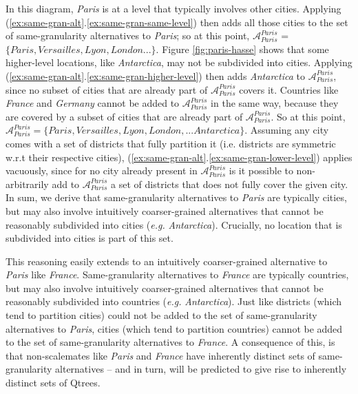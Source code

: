 	In this diagram, \textit{Paris} is at a level that typically involves other cities. Applying (\ref{ex:same-gran-alt}.\ref{ex:same-gran-same-level}) then adds all those cities to the set of same-granularity alternatives to \textit{Paris}; so at this point, $\mathcal{A}_{\textit{Paris}}^{\textit{Paris}}$ = $\lbrace \textit{Paris}, \textit{Versailles}, \textit{Lyon}, \textit{London} ...\rbrace$. Figure \ref{fig:paris-hasse} shows that some higher-level locations, like \textit{Antarctica}, may not be subdivided into cities. Applying (\ref{ex:same-gran-alt}.\ref{ex:same-gran-higher-level}) then adds \textit{Antarctica} to $\mathcal{A}_{\textit{Paris}}^{\textit{Paris}}$, since no subset of cities that are already part of $\mathcal{A}_{\textit{Paris}}^{\textit{Paris}}$ covers it. Countries like \textit{France} and \textit{Germany} cannot be added to $\mathcal{A}_{\textit{Paris}}^{\textit{Paris}}$ in the same way, because they are covered by a subset of cities that are already part of $\mathcal{A}_{\textit{Paris}}^{\textit{Paris}}$. So at this point, $\mathcal{A}_{\textit{Paris}}^{\textit{Paris}} = \lbrace \textit{Paris}, \textit{Versailles}, \textit{Lyon}, \textit{London}, ...  \textit{Antarctica}\rbrace$. Assuming any city comes with a set of districts that fully partition it (i.e. districts are symmetric w.r.t their respective cities), (\ref{ex:same-gran-alt}.\ref{ex:same-gran-lower-level}) applies vacuously, since for no city already present in $\mathcal{A}_{\textit{Paris}}^{\textit{Paris}}$ is it possible to non-arbitrarily add to $\mathcal{A}_{\textit{Paris}}^{\textit{Paris}}$ a set of districts that does not fully cover the given city. In sum, we derive that same-granularity alternatives to \textit{Paris} are typically cities, but may also involve intuitively coarser-grained alternatives that cannot be reasonably subdivided into cities (\textit{e.g.} \textit{Antarctica}). Crucially, no location that is subdivided into cities is part of this set.
	
	This reasoning easily extends to an intuitively coarser-grained alternative to \textit{Paris} like \textit{France}. Same-granularity alternatives to \textit{France} are typically countries, but may also involve intuitively coarser-grained alternatives that cannot be reasonably subdivided into countries (\textit{e.g.} \textit{Antarctica}). Just like districts (which tend to partition cities) could not be added to the set of same-granularity alternatives to \textit{Paris}, cities (which tend to partition countries) cannot be added to the set of same-granularity alternatives to \textit{France}. A consequence of this, is that non-scalemates like \textit{Paris} and \textit{France} have inherently distinct sets of same-granularity alternatives -- and in turn, will be predicted to give rise to inherently distinct sets of Qtrees.

